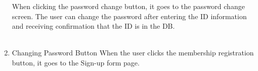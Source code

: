 \documentclass[conference]{IEEEtran}
\begin{document}
\begin{enumerate}
        When clicking the password change button, it goes to the password change screen. The user can change the password after entering the ID information and receiving confirmation that the ID is in the DB.\\ \\
    \item Changing Password Button
        When the user clicks the membership registration button, it goes to the Sign-up form page. \\ \\ \\ \\ \\ \\ \\
\end{enumerate}

\break
\end{document}
